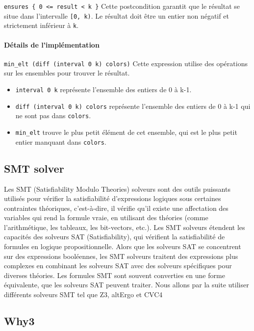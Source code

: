 \documentclass[11pt]{article}
\begin{document}
\texttt{ensures \{ 0 <= result < k \}}
  Cette postcondition garantit que le résultat se situe dans l'intervalle \texttt{[0, k)}. 
Le résultat doit être un entier non négatif et strictement inférieur à \texttt{k}.

\paragraph{Détails de l'implémentation}
\label{sec:org4303a7d}

\texttt{min\_elt (diff (interval 0 k) colors)}
  Cette expression utilise des opérations sur les ensembles pour trouver le résultat.
\begin{itemize}
\item \texttt{interval 0 k} représente l'ensemble des entiers de 0 à k-1.
\item \texttt{diff (interval 0 k) colors} représente l'ensemble des entiers de 0 à k-1 qui ne sont pas dans \texttt{colors}.
\item \texttt{min\_elt} trouve le plus petit élément de cet ensemble, qui est le plus petit entier manquant dans \texttt{colors}.
\end{itemize}

\subsection{SMT solver}
\label{sec:org6cbc25d}

Les SMT (Satisfiability Modulo Theories) solveurs sont des outils puissants utilisés pour 
vérifier la satisfiabilité d'expressions logiques sous certaines contraintes théoriques, 
c'est-à-dire, il vérifie qu'il existe une affectation des variables qui rend la formule vraie, 
en utilisant des théories (comme l'arithmétique, les tableaux, les bit-vectors, etc.).
Les SMT solveurs étendent les capacités des solveurs SAT (Satisfiability), 
qui vérifient la satisfiabilité de formules en logique propositionnelle. 
Alors que les solveurs SAT se concentrent sur des expressions booléennes, 
les SMT solveurs traitent des expressions plus complexes en combinant les solveurs SAT avec des solveurs spécifiques pour diverses théories.
Les formules SMT sont souvent converties en une forme équivalente, que les solveurs SAT peuvent traiter.
Nous allons par la suite utiliser différents solveurs SMT tel que Z3, altErgo et CVC4

\subsection{Why3}
\label{sec:org4f8e959}
\end{document}
